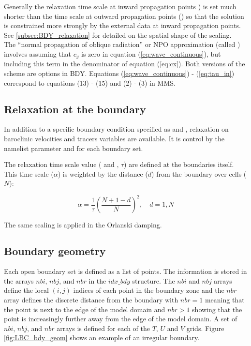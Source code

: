 \documentclass[../main/NEMO_manual]{subfiles}
\begin{document}
Generally the relaxation time scale at inward propagation points ) is set much shorter than the time scale at outward propagation
points () so that the solution is constrained more strongly by the external data at inward propagation points.
See \autoref{subsec:BDY_relaxation} for detailed on the spatial shape of the scaling.\\ 
The ``normal propagation of oblique radiation'' or NPO approximation (called ) involves assuming 
that $c_y$ is zero in equation (\autoref{eq:wave_continuous}), but including
this term in the denominator of equation (\autoref{eq:cx}). Both versions of the scheme are options in BDY. Equations
(\autoref{eq:wave_continuous}) - (\autoref{eq:tau_in}) correspond to equations (13) - (15) and (2) - (3) in MMS.\\

\subsection{Relaxation at the boundary}
\label{subsec:BDY_relaxation}

In addition to a specific boundary condition specified as  and , relaxation on baroclinic velocities and tracers variables are available. 
It is control by the namelist parameter  and  for each boundary set.

The relaxation time scale value ( and , $\tau$) are defined at the boundaries itself. 
This time scale ($\alpha$) is weighted by the distance ($d$) from the boundary over  cells ($N$):

\[
  \alpha = \frac{1}{\tau}(\frac{N+1-d}{N})^2,       \quad d=1,N
\]

The same scaling is applied in the Orlanski damping. 

\subsection{Boundary geometry}
\label{subsec:BDY_geometry}

Each open boundary set is defined as a list of points.
The information is stored in the arrays $nbi$, $nbj$, and $nbr$ in the $idx\_bdy$ structure.
The $nbi$ and $nbj$ arrays define the local $(i,j)$ indices of each point in the boundary zone and
the $nbr$ array defines the discrete distance from the boundary with $nbr=1$ meaning that
the point is next to the edge of the model domain and $nbr>1$ showing that
the point is increasingly further away from the edge of the model domain.
A set of $nbi$, $nbj$, and $nbr$ arrays is defined for each of the $T$, $U$ and $V$ grids.
Figure \autoref{fig:LBC_bdy_geom} shows an example of an irregular boundary. 
\end{document}

